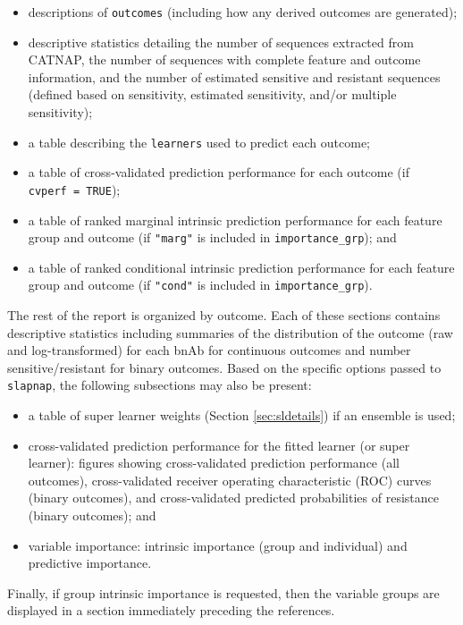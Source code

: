 \documentclass[]{article}
\providecommand{\tightlist}{%
  \setlength{\itemsep}{0pt}\setlength{\parskip}{0pt}}
\begin{document}
\begin{itemize}
\tightlist
\item
  descriptions of \texttt{outcomes} (including how any derived outcomes
  are generated);
\item
  descriptive statistics detailing the number of sequences extracted
  from CATNAP, the number of sequences with complete feature and outcome
  information, and the number of estimated sensitive and resistant
  sequences (defined based on sensitivity, estimated sensitivity, and/or
  multiple sensitivity);
\item
  a table describing the \texttt{learners} used to predict each outcome;
\item
  a table of cross-validated prediction performance for each outcome (if
  \texttt{cvperf\ =\ TRUE});
\item
  a table of ranked marginal intrinsic prediction performance for each
  feature group and outcome (if \texttt{"marg"} is included in
  \texttt{importance\_grp}); and
\item
  a table of ranked conditional intrinsic prediction performance for
  each feature group and outcome (if \texttt{"cond"} is included in
  \texttt{importance\_grp}).
\end{itemize}

The rest of the report is organized by outcome. Each of these sections
contains descriptive statistics including summaries of the distribution
of the outcome (raw and log-transformed) for each bnAb for continuous
outcomes and number sensitive/resistant for binary outcomes. Based on
the specific options passed to \texttt{slapnap}, the following
subsections may also be present:

\begin{itemize}
\tightlist
\item
  a table of super learner weights (Section \ref{sec:sldetails}) if an
  ensemble is used;
\item
  cross-validated prediction performance for the fitted learner (or
  super learner): figures showing cross-validated prediction performance
  (all outcomes), cross-validated receiver operating characteristic
  (ROC) curves (binary outcomes), and cross-validated predicted
  probabilities of resistance (binary outcomes); and
\item
  variable importance: intrinsic importance (group and individual) and
  predictive importance.
\end{itemize}

Finally, if group intrinsic importance is requested, then the variable
groups are displayed in a section immediately preceding the references.
\end{document}
